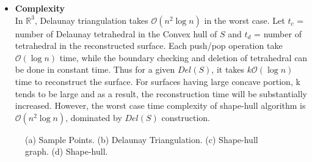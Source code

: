 \documentclass[preprint,5p,times,twocolumn]{elsarticle}
\begin{document}
\begin{itemize}
    \item \textbf{Complexity}\\
    In $\mathbb{R}^3$, Delaunay triangulation takes $\mathcal{O}(n^2\log{}n)$ in the worst case\cite{Boissonnat:1984:GST:357346.357349}. Let $t_c$ = number of Delaunay tetrahedral in the Convex hull of $S$ and $t_d$ = number of tetrahedral in the reconstructed surface. Each push/pop operation take $\mathcal{O}(\log{}n)$ time, while the boundary  checking and deletion of tetrahedral can be done in constant time. Thus for a given $Del(S)$, it takes $k\mathcal{O}(\log{}n)$ time to reconstruct the surface. For surfaces having large concave portion, k tends to be large and as a result, the reconstruction time will be substantially increased. However, the worst case time complexity of shape-hull algorithm is $\mathcal{O}(n^2\log{}n)$, dominated by $Del(S)$ construction.
\end{itemize}
\begin{figure}[!h]
	\centering
	\caption{
		\label{teaser_fig}(a) Sample Points. (b) Delaunay Triangulation. (c) Shape-hull graph. (d) Shape-hull.
	}
\end{figure}



\end{document}
